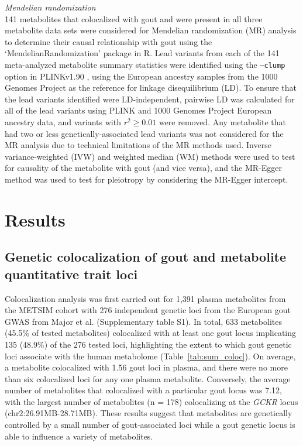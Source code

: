 \documentclass[gucdd,article,submit,pdftex,moreauthors]{Definitions/mdpi}
\begin{document}
\noindent
\textit{Mendelian randomization}\\
141 metabolites that colocalized with gout and were present in all three metabolite data sets were considered for Mendelian randomization (MR) analysis to determine their causal relationship with gout using the ‘MendelianRandomization’ \citep{yavorska_mendelianrandomization_2017} package in R.
Lead variants from each of the 141 meta-analyzed metabolite summary statistics were identified using the \texttt{--clump} option in PLINKv1.90 \citep{chang_second-generation_2015}, using the European ancestry samples from the 1000 Genomes Project \citep{auton_global_2015} as the reference for linkage disequilibrium (LD).
To ensure that the lead variants identified were LD-independent, pairwise LD was calculated for all of the lead variants using PLINK and 1000 Genomes Project European ancestry data, and variants with $r^{2} \ge 0.01$ were removed.
Any metabolite that had two or less genetically-associated lead variants was not considered for the MR analysis due to technical limitations of the MR methods used.
Inverse variance-weighted (IVW) and weighted median (WM) methods were used to test for causality of the metabolite with gout (and vice versa), and the MR-Egger method was used to test for pleiotropy by considering the MR-Egger intercept.
\\

\section{Results}

\subsection{Genetic colocalization of gout and metabolite quantitative trait loci}
Colocalization analysis was first carried out for 1,391 plasma metabolites from the METSIM cohort with 276 independent genetic loci from the European gout GWAS from Major et al. \citep{major_genome-wide_2024} (Supplementary table S1).
In total, 633 metabolites (45.5\% of tested metabolites) colocalized with at least one gout locus implicating 135 (48.9\%) of the 276 tested loci, highlighting the extent to which gout genetic loci associate with the human metabolome (Table~\ref{tab:sum_coloc}).
On average, a metabolite colocalized with 1.56 gout loci in plasma, and there were no more than six colocalized loci for any one plasma metabolite.
Conversely, the average number of metabolites that colocalized with a particular gout locus was 7.12, with the largest number of metabolites (n = 178) colocalizing at the \textit{GCKR} locus (chr2:26.91MB-28.71MB).
These results suggest that metabolites are genetically controlled by a small number of gout-associated loci while a gout genetic locus is able to influence a variety of metabolites.
\end{document}
